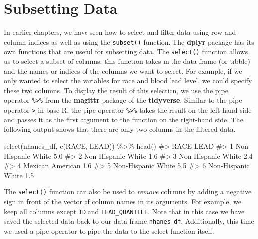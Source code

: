 \documentclass[
  letterpaper,
]{latex/krantz}
\makeatletter
\newenvironment{Shaded}{\begin{snugshade}}{\end{snugshade}}
\newcommand{\CommentTok}[1]{\textcolor[rgb]{0.37,0.37,0.37}{#1}}
\newcommand{\FunctionTok}[1]{\textcolor[rgb]{0.28,0.35,0.67}{#1}}
\newcommand{\NormalTok}[1]{\textcolor[rgb]{0.00,0.23,0.31}{#1}}
\newcommand{\SpecialCharTok}[1]{\textcolor[rgb]{0.37,0.37,0.37}{#1}}
\newenvironment{kframe}{%
\medskip{}
\setlength{\fboxsep}{.8em}
 \def\at@end@of@kframe{}%
 \ifinner\ifhmode%
  \def\at@end@of@kframe{\end{minipage}}%
  \begin{minipage}{\columnwidth}%
 \fi\fi%
 \def\FrameCommand##1{\hskip\@totalleftmargin \hskip-\fboxsep
 \colorbox{shadecolor}{##1}\hskip-\fboxsep
     \hskip-\linewidth \hskip-\@totalleftmargin \hskip\columnwidth}%
 \MakeFramed {\advance\hsize-\width
   \@totalleftmargin\z@ \linewidth\hsize
   \@setminipage}}%
 {\par\unskip\endMakeFramed%
 \at@end@of@kframe}
\renewenvironment{Shaded}{\begin{kframe}}{\end{kframe}}
\makeatother
\begin{document}
\section{\texorpdfstring{Subsetting Data 
}{Subsetting Data   }}\label{subsetting-data}

In earlier chapters, we have seen how to select and filter data using
row and column indices as well as using the
\texttt{subset()}
function. The \textbf{dplyr} package has its own functions that are
useful for subsetting data. The
\texttt{select()} function
allows us to select a subset of columns: this function takes in the data
frame (or tibble) and the names or indices of the columns we want to
select. For example, if we only wanted to select the variables for race
and blood lead level, we could specify these two columns. To display the
result of this selection, we use the pipe operator
\texttt{\%\textgreater{}\%}  from the
\textbf{magittr}  package of the
\textbf{tidyverse}. Similar to the pipe operator
\texttt{\textbar{}\textgreater{}} in base R, the pipe operator
\texttt{\%\textgreater{}\%} takes the result on the left-hand side and
passes it as the first argument to the function on the right-hand side.
The following output shows that there are only two columns in the
filtered data.

\begin{Shaded}
\begin{Highlighting}[]
\FunctionTok{select}\NormalTok{(nhanes\_df, }\FunctionTok{c}\NormalTok{(RACE, LEAD)) }\SpecialCharTok{\%\textgreater{}\%} \FunctionTok{head}\NormalTok{()}
\CommentTok{\#\textgreater{}                 RACE LEAD}
\CommentTok{\#\textgreater{} 1 Non{-}Hispanic White  5.0}
\CommentTok{\#\textgreater{} 2 Non{-}Hispanic White  1.6}
\CommentTok{\#\textgreater{} 3 Non{-}Hispanic White  2.4}
\CommentTok{\#\textgreater{} 4   Mexican American  1.6}
\CommentTok{\#\textgreater{} 5 Non{-}Hispanic White  5.5}
\CommentTok{\#\textgreater{} 6 Non{-}Hispanic White  1.5}
\end{Highlighting}
\end{Shaded}

The \texttt{select()} function can also be used to \emph{remove} columns
by adding a negative sign in front of the vector of column names in its
arguments. For example, we keep all columns except \texttt{ID} and
\texttt{LEAD\_QUANTILE}. Note that in this case we have saved the
selected data back to our data frame \texttt{nhanes\_df}. Additionally,
this time we used a pipe operator to pipe the data to the select
function itself.
\end{document}

